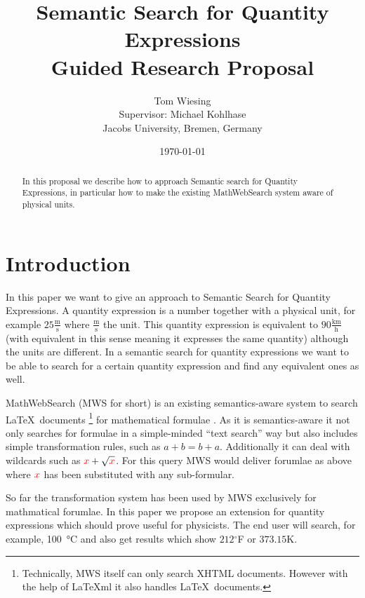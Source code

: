 \documentclass[11pt]{article}
\title{Semantic Search for Quantity Expressions\\ \vspace{2 mm} Guided Research Proposal}
\author{Tom Wiesing\\Supervisor: Michael Kohlhase\\Jacobs University, Bremen, Germany}
\date{\today}
\begin{document}
\maketitle

\begin{abstract}
  In this proposal we describe how to approach Semantic search for Quantity Expressions, in particular how to make the existing MathWebSearch system aware of physical units.
\end{abstract}

\section{Introduction}

In this paper we want to give an approach to Semantic Search for Quantity Expressions. A quantity expression is a number together with a physical unit, for example $25 \frac{\text{m}}{\text{s}}$ where $\frac{\text{m}}{\text{s}}$ the unit. This quantity expression is equivalent to $90 \frac{\text{km}}{\text{h}}$ (with equivalent in this sense meaning it expresses the same quantity) although the units are different. In a semantic search for quantity expressions we want to be able to search for a certain quantity expression and find any equivalent ones as well.

MathWebSearch (MWS for short) is an existing semantics-aware system to search \LaTeX \  documents \footnote{Technically, MWS itself can only search XHTML documents. However with the help of \LaTeX{}ml \cite{Miller:latexml:base} it also handles \LaTeX \  documents. } for mathematical formulae \cite{HamKohPro:man14}. As it is semantics-aware it not only searches for formulae in a simple-minded ``text search'' way but also includes simple transformation rules, such as $a + b = b + a$. Additionally it can deal with wildcards such as $ { \color{red} x} + \sqrt{\color{red} x}$. For this query MWS would deliver forumlae as above where $ { \color{red} x} $ has been substituted with any sub-formular.

So far the transformation system has been used by MWS exclusively for mathmatical forumlae. In this paper we propose an extension for quantity expressions which should prove useful for physicists.
The end user will search, for example, \SI{100}{\degreeCelsius} and also get results which show $212$$^\circ$F or $373.15$K.
\end{document}
